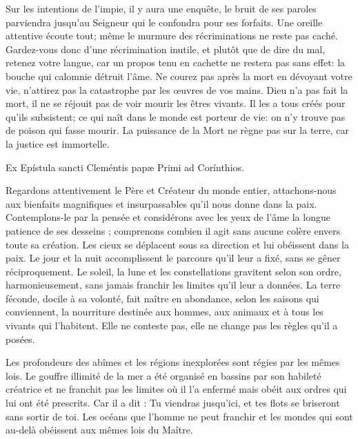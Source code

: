 Sur les intentions de l’impie, il y aura une enquête,
	le bruit de ses paroles parviendra jusqu’au Seigneur
		qui le confondra pour ses forfaits.
Une oreille attentive écoute tout;
	même le murmure des récriminations ne reste pas caché.
Gardez-vous donc d’une récrimination inutile,
	et plutôt que de dire du mal, retenez votre langue,
	car un propos tenu en cachette ne restera pas sans effet:
	la bouche qui calomnie détruit l’âme.
Ne courez pas après la mort en dévoyant votre vie, 
	n’attirez pas la catastrophe par les œuvres de vos mains.
Dieu n’a pas fait la mort, 
	il ne se réjouit pas de voir mourir les êtres vivants.
Il les a tous créés pour qu’ils subsistent; 
	ce qui naît dans le monde est porteur de vie: 
	on n’y trouve pas de poison qui fasse mourir.
La puissance de la Mort ne règne pas sur la terre,
	car la justice est immortelle.


Ex Epístula sancti Cleméntis papæ Primi ad Corínthios.

Regardons attentivement le Père et Créateur du monde entier, 
	attachons-nous aux bienfaits magnifiques et insurpassables qu'il nous donne dans la paix.
Contemplons-le par la pensée
	et considérons avec les yeux de l'âme la longue patience de ses desseins ;
	comprenons combien il agit sans aucune colère envers toute sa création.
Les cieux se déplacent sous sa direction et lui obéissent dans la paix.
Le jour et la nuit accomplissent le parcours qu'il leur a fixé, sans se gêner réciproquement.
Le soleil, la lune et les constellations gravitent selon son ordre, harmonieusement,
	sans jamais franchir les limites qu'il leur a données.
La terre féconde, docile à sa volonté,
	fait naître en abondance, selon les saisons qui conviennent, la nourriture
		destinée aux hommes, aux animaux et à tous les vivants qui l'habitent.
Elle ne conteste pas, elle ne change pas les règles qu'il a posées.


Les profondeurs des abîmes et les régions inexplorées sont régies par les mêmes lois.
Le gouffre illimité de la mer a été organisé en bassins par son habileté créatrice
	et ne franchit pas les limites où il l'a enfermé
	mais obéit aux ordres qui lui ont été prescrits.
Car il a dit : Tu viendras jusqu'ici, et tes flots se briseront sans sortir de toi.
Les océans que l'homme ne peut franchir et les mondes qui sont au-delà
	obéissent aux mêmes lois du Maître.


